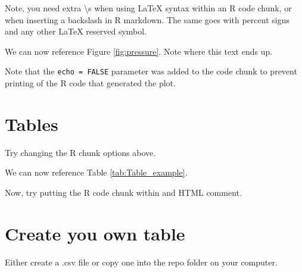 \documentclass[12pt,]{article}
\begin{document}
Note, you need extra \textbackslash{}s when using LaTeX syntax within an
R code chunk, or when inserting a backslash in R markdown. The same goes
with percent signs and any other LaTeX reserved symbol.

We can now reference Figure \ref{fig:pressure}. Note where this text
ends up.

Note that the \texttt{echo\ =\ FALSE} parameter was added to the code
chunk to prevent printing of the R code that generated the plot.

\FloatBarrier

\section{Tables}\label{tables}

\begin{table}[ht]
\centering
\caption{This is where you write your caption} 
\label{tab:Table_example}
\end{table}

Try changing the R chunk options above.

We can now reference Table \ref{tab:Table_example}.

Now, try putting the R code chunk within and HTML comment.

\section{Create you own table}\label{create-you-own-table}

Either create a .csv file or copy one into the repo folder on your
computer.
\end{document}
